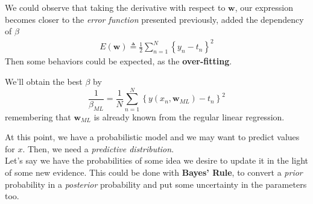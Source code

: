 \begin{frame}{\insertsubsection}
We could observe that taking the derivative with respect to $\mathbf{w}$, our expression becomes closer to the \textit{error function} presented previously, added the dependency of $\beta$
\begin{align*}
	E(\mathbf{w}) \triangleq \frac{1}{2} \sum_{n=1}^N \left\{ y_n -  t_n \right\}^2
\end{align*}
Then some behaviors could be expected, as the \textbf{over-fitting}.
%
\end{frame}

\begin{frame}{\insertsubsection}
	We'll obtain the best $\beta$ by
	\begin{equation*}
	\frac{1}{\beta_{ML}} = \frac{1}{N} \sum^N_{n=1} \left\{ y(x_n, \mathbf{w}_{ML}) - t_n \right\}^2
	\end{equation*}
	remembering that $\mathbf{w}_{ML}$ is already known from the regular linear regression.	
\end{frame}

\begin{frame}{\insertsubsection}

At this point, we have a probabilistic model and we may want to predict values for $x$. Then, we need a \textit{predictive distribution}. \\
\vspace{1em}
Let's say we have the probabilities of some idea we desire to update it in the light of some new evidence. This could be done with \textbf{Bayes' Rule}, to convert a \textit{prior} probability in a \textit{posterior} probability and put some uncertainty in the parameters too. \\
\end{frame}

